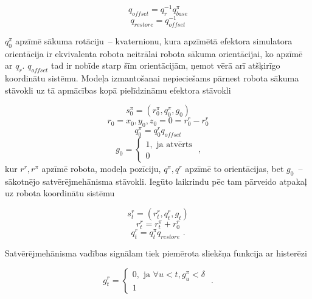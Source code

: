 \documentclass[12pt, a4paper]{article}
\numberwithin{equation}{section} %
\begin{document}
\begin{equation}
    q_{offset} = q_r^{-1}q^{\pi}_{base}
\end{equation}
\begin{equation}
    q_{restore} = q_{offset}^{-1}
\end{equation}

$q^{\pi}_0$ apzīmē sākuma rotāciju~-- kvaternionu, kura apzīmētā efektora simulatora orientācija ir ekvivalenta robota neitrālai robota sākuma orientācijai, ko apzīmē ar $q_r$. $q_{offset}$ tad ir nobīde starp šīm orientācijām, ņemot vērā arī atšķirīgo koordinātu sistēmu. Modeļa izmantošanai nepieciešams pārnest robota sākuma stāvokli uz tā apmācības kopā pielīdzināmu efektora stāvokli

\begin{equation}
    s^{\pi}_0 = (r^{\pi}_0, q^{\pi}_0 , g_0)
\end{equation}
\begin{equation}
    r_0 = x_0, y_0, z_0 = 0 = r^r_0 - r^r_0
\end{equation}
\begin{equation}
    q^{\pi}_0 = q^{r}_0q_{offset}
\end{equation}
\begin{equation}
    g_0 = 
    \begin{cases}
        1, \text{ ja atvērts} \\
        0
    \end{cases}
\text{ ,}
\end{equation}
kur $r^r, r^{\pi}$ apzīmē robota, modeļa pozīciju, $q^{\pi}, q^r$ apzīmē to orientācijas, bet $g_0$~-- sākotnējo satvērējmehānisma stāvokli. Iegūto laikrindu pēc tam pārveido atpakaļ uz robota koordinātu sistēmu 

\begin{equation}
    s^{r}_t = (r^r_t, q^r_t , g_t)
\end{equation}
\begin{equation}
    r^r_t = r^{\pi}_t + r^r_0
\end{equation}
\begin{equation}
    q^r_t = q^{\pi}_tq_{restore}
\text{ .}
\end{equation}

Satvērējmehānisma vadības signālam tiek piemērota sliekšņa funkcija ar histerēzi

\begin{equation}
    g^r_t = 
    \begin{cases}
        0, \text{ ja } \forall u < t, g^{\pi}_u < \delta \\
        1
    \end{cases}
\text{ .}
\end{equation}
\end{document}
